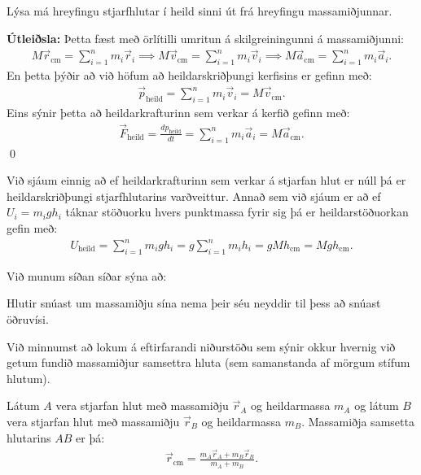 \begin{tcolorbox}
\begin{theorem}
Lýsa má hreyfingu stjarfhlutar í heild sinni út frá hreyfingu massamiðjunnar.
\end{theorem}
\end{tcolorbox}

\textbf{Útleiðsla:} Þetta fæst með örlítilli umritun á skilgreiningunni á massamiðjunni:
\begin{align*}
    M\vec{r}_{\text{cm}} = \sum_{i=1}^{n} m_i \vec{r}_i \implies M \vec{v}_{\text{cm}} = \sum_{i=1}^{n} m_i \vec{v}_i \implies  M \vec{a}_{\text{cm}} = \sum_{i=1}^{n} m_i \vec{a}_i.
\end{align*}
En þetta þýðir að við höfum að heildarskriðþungi kerfisins er gefinn með:
\begin{align*}
    \vec{p}_{\text{heild}} = \sum_{i=1}^{n} m_i \vec{v}_i = M\vec{v}_{\text{cm}}.
\end{align*}
Eins sýnir þetta að heildarkrafturinn sem verkar á kerfið gefinn með:
\begin{align*}
    \vec{F}_{\text{heild}} = \frac{dp_{\text{heild}}}{dt} = \sum_{i=1}^{n} m_i \vec{a}_i = M\vec{a}_{\text{cm}}.
\end{align*}
\qed

Við sjáum einnig að ef heildarkrafturinn sem verkar á stjarfan hlut er núll þá er heildarskriðþungi stjarfhlutarins varðveittur. Annað sem við sjáum er að ef $U_i = m_igh_i$ táknar stöðuorku hvers punktmassa fyrir sig þá er heildarstöðuorkan gefin með:
\begin{align*}
    U_{\text{heild}} = \sum_{i=1}^{n} m_igh_i = g \sum_{i=1}^{n}m_i h_i = g Mh_{\text{cm}} = Mgh_{\text{cm}}.
\end{align*}

Við munum síðan síðar sýna að:

\begin{tcolorbox}
\begin{theorem}
Hlutir snúast um massamiðju sína nema þeir séu neyddir til þess að snúast öðruvísi.
\end{theorem}
\end{tcolorbox}

Við minnumst að lokum á eftirfarandi niðurstöðu sem sýnir okkur hvernig við getum fundið massamiðjur samsettra hluta (sem samanstanda af mörgum stífum hlutum).


\begin{tcolorbox}
\begin{theorem}
Látum $A$ vera stjarfan hlut með massamiðju $\vec{r}_A$ og heildarmassa $m_A$ og látum $B$ vera stjarfan hlut með massamiðju $\vec{r}_B$ og heildarmassa $m_B$. Massamiðja samsetta hlutarins $AB$ er þá:
\begin{align*}
    \vec{r}_{\text{cm}} = \frac{m_A \vec{r}_A+m_B\vec{r}_B}{m_A + m_B}.
\end{align*}
\end{theorem}
\end{tcolorbox}

